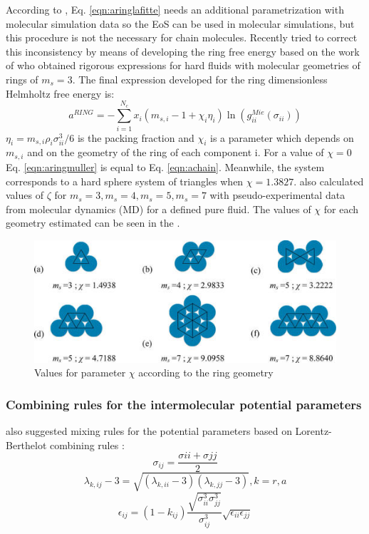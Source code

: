 According to , Eq. \eqref{eqn:aringlafitte} needs an additional parametrization with molecular simulation data so the EoS can  be used in molecular simulations, but this procedure is not the necessary for chain molecules. Recently  tried to correct this inconsistency by means of developing the ring free energy based on the work of  who obtained rigorous expressions for hard fluids with molecular geometries of rings of $m_s=3$. The final expression developed for the ring dimensionless Helmholtz free energy is:
\begin{equation}
a^{RING} =-\sum_{i=1}^{N_{c}} x_{i}(m_{s,i}-1+\chi_{i}\eta_{i})\ln(g_{ii}^{Mie}(\sigma_{ii}))
\label{eqn:aringmuller}
\end{equation}
$\eta_{i}=m_{s,i}\rho_{i}\sigma_{ii}^{3}/6$ is the packing fraction and $\chi_{i}$ is a parameter which depends on $m_{s,i}$ and on the geometry of the ring of each component i. For a value of $\chi=0$ Eq. \eqref{eqn:aringmuller} is equal to Eq. \eqref{eqn:achain}. Meanwhile, the system corresponds to a hard sphere system of triangles when $\chi=1.3827$.  also calculated values of $\zeta$ for $m_{s}=3,m_{s}=4,m_{s}=5,m_{s}=7$ with pseudo-experimental data from molecular dynamics (MD) for a defined pure fluid. The values of $\chi$ for each geometry estimated can be seen in the .
\begin{figure}[th]
\centering
\includegraphics[scale=0.8]{Figures/mullergeo.jpg}
\caption{Values for parameter $\chi$ according to the ring geometry \cite{muller2017}}
\label{ringqsi}
\end{figure}

\subsubsection{Combining rules for the intermolecular potential parameters}
 also suggested mixing rules for the potential parameters based on Lorentz-Berthelot combining rules \cite{rowlinson}:
\begin{equation}
\sigma_{ij} =\frac{\sigma{ii}+\sigma{jj}}{2}
\label{eqn:sigmamix}
\end{equation}
\begin{equation}
\lambda_{k,ij} -3 =\sqrt{(\lambda_{k,ii}-3)(\lambda_{k,jj}-3)} , k=r,a
\label{eqn:lambdamix}
\end{equation}
\begin{equation}
\epsilon_{ij} =(1-k_{ij})\frac{\sqrt{\sigma_{ii}^{3}\sigma_{jj}^{3}}}{\sigma_{ij}^{3}}\sqrt{\epsilon_{ii}\epsilon_{jj}}
\label{eqn:epsmix}
\end{equation}

